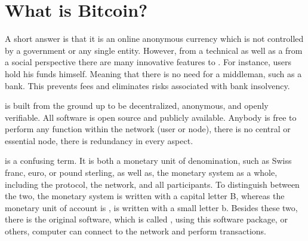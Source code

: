 
\chapter{What is Bitcoin?}

A short answer is that it is an online anonymous currency which is
not controlled by a government or any single entity. However, from
a technical as well as a from a social perspective there are many
innovative features to . For instance,
users hold his funds himself. Meaning that there is no need for a
middleman, such as a bank. This prevents fees and eliminates risks
associated with bank insolvency. 

is built from the ground up to be decentralized,
anonymous, and openly verifiable. All software is open source and
publicly available. Anybody is free to perform any function within
the network (user or node), there is no central or essential node,
there is redundancy in every aspect.

is a confusing term. It is both a monetary
unit of denomination, such as Swiss franc, euro, or pound sterling,
as well as, the monetary system as a whole, including the protocol,
the network, and all participants. To distinguish between the two,
the monetary system  is written with a
capital letter B, whereas the monetary unit of account is ,
is written with a small letter b. Besides these two, there is the
original  software, which is called\textbf{
}, using this software package, or others,
computer can connect to the  network and
perform transactions.
